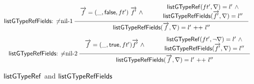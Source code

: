 {\begin{figure}[htbp]
\begin{gather*}
	\quad
	\\[1ex]
	\inferii[\listgtypereffields: $\neq$nil-1]
	{\seqq{\listgtypereffields(\myvec{f}, \flipped) = l'\ {++}\ l''}}
	{
		\begin{array}{c}
			\myvec{f} = (\_, \lfalse, ft')\  \myvec{f'} \ \wedge
		\end{array}
	}
	{
		\begin{array}{c}
			\listgtyperef(ft', \flipped) = l'\ \wedge \\
			\listgtypereffields(\myvec{f'}, \flipped) = l''
		\end{array}
	} 
	\quad
	\\[1ex]
	\inferii[\listgtypereffields: $\neq$nil-2]
	{\seqq{\listgtypereffields(\myvec{f}, \flipped) = l'\ {++}\ l''}}
	{
		\begin{array}{c}
			\myvec{f} = (\_, \ltrue, ft') \myvec{f'}\ \wedge 
		\end{array}
	}
	{
		\begin{array}{c}
			\listgtyperef(ft', \neg \flipped) = l'\ \wedge \\
			\listgtypereffields(\myvec{f'}, \flipped) = l''
		\end{array}
	} 
\end{gather*}
\caption{${\sf listGTypeRef}$ and ${\sf listGTypeRefFields}$}
\label{fig:list-ftype-fields}
\end{figure}
}

